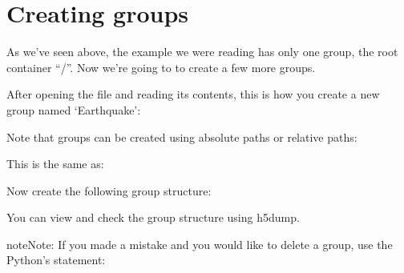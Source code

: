 \documentclass[letterpaper,10pt,english]{sphinxmanual}
\begin{document}
\section{Creating groups}
\label{\detokenize{index:creating-groups}}
\sphinxAtStartPar
As we’ve seen above, the example we were reading has only one group, the root container “/”. Now we’re going to to create a few more groups.

\sphinxAtStartPar
After opening the file and reading its contents, this is how you create a new group named ‘Earthquake’:

\begin{sphinxVerbatim}[commandchars=\\\{\}]
  
\end{sphinxVerbatim}

\sphinxAtStartPar
Note that groups can be created using absolute paths or relative paths:

\begin{sphinxVerbatim}[commandchars=\\\{\}]
  
\end{sphinxVerbatim}

\sphinxAtStartPar
This is the same as:

\begin{sphinxVerbatim}[commandchars=\\\{\}]
  
\end{sphinxVerbatim}

\sphinxAtStartPar
Now create the following group structure:

\noindent{}

\sphinxAtStartPar
You can view and check the group structure using h5dump.

\begin{sphinxadmonition}{note}{Note:}
\sphinxAtStartPar
If you made a mistake and you would like to delete a group, use the Python’s  statement:

\begin{sphinxVerbatim}[commandchars=\\\{\}]
 \PYG{p}{[}\PYG{p}{]}
\end{sphinxVerbatim}
\end{sphinxadmonition}
\end{document}
